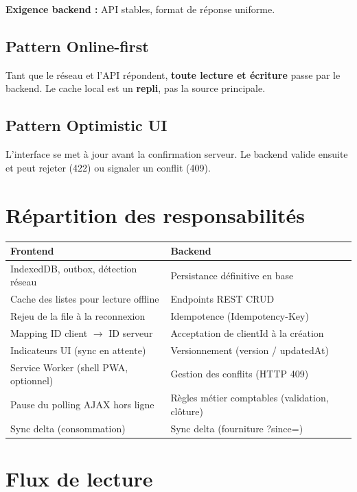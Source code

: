 \documentclass[12pt,a4paper]{report}
\begin{document}
\textbf{Exigence backend :} API stables, format de réponse uniforme.

\subsection{Pattern Online-first}

Tant que le réseau et l'API répondent, \textbf{toute lecture et écriture} passe par le backend. Le cache local est un \textbf{repli}, pas la source principale.

\subsection{Pattern Optimistic UI}

L'interface se met à jour avant la confirmation serveur. Le backend valide ensuite et peut rejeter (422) ou signaler un conflit (409).

\section{Répartition des responsabilités}

\begin{longtable}{@{}p{5.5cm}p{7cm}@{}}
\hline
\textbf{Frontend} & \textbf{Backend} \\
\hline
\endhead
IndexedDB, outbox, détection réseau & Persistance définitive en base \\
\hline
Cache des listes pour lecture offline & Endpoints REST CRUD \\
\hline
Rejeu de la file à la reconnexion & Idempotence (Idempotency-Key) \\
\hline
Mapping ID client $\rightarrow$ ID serveur & Acceptation de clientId à la création \\
\hline
Indicateurs UI (sync en attente) & Versionnement (version / updatedAt) \\
\hline
Service Worker (shell PWA, optionnel) & Gestion des conflits (HTTP 409) \\
\hline
Pause du polling AJAX hors ligne & Règles métier comptables (validation, clôture) \\
\hline
Sync delta (consommation) & Sync delta (fourniture ?since=) \\
\hline
\end{longtable}

\section{Flux de lecture}
\end{document}
